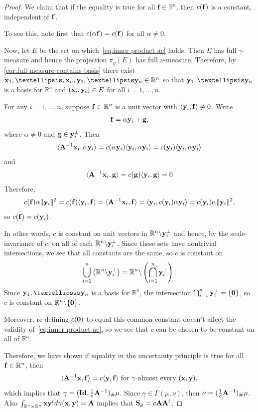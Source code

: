 \documentclass[10pt,a4paper]{amsart}
\newcommand\R{{\mathbb R}}
\begin{document}
\begin{proof}
We claim that if the equality is true for all $\mathbf{f} \in \mathbb{R}^n$, then $c({\bf f})$ is a constant, independent of ${\bf f}$. 

To see this, note first that $c(\alpha {\bf f}) = c({\bf f})$ for all $\alpha \neq 0$. 

Now, let $E$ be the set on which~\eqref{eq:inner product ae} holds. Then $E$ has full $\gamma$-measure and hence the projection $\pi_y(E)$ has full $\nu$-measure. Therefore, by \cref{cor:full measure contains basis} there exist ${\bf x}_1, \dots , {\bf x}_n, {\bf y}_1, \dots {\bf y}_n \in \R^n$ so that ${\bf y}_1, \dots {\bf y}_n$ is a basis for $\R^n$ and $({\bf x}_i, {\bf y}_i) \in E$ for all $i=1, \dots , n$.

For any $i=1, \dots , n$, suppose ${\bf f} \in \R^n$ is a unit vector with $\langle {\bf y}_i, {\bf f} \rangle \neq 0$. Write 
\[
    {\bf f} = \alpha {\bf y}_i + {\bf g},
\]
where $\alpha \neq 0$ and ${\bf g} \in {\bf y}_i^\perp$. Then
\[
\langle {\bf A}^{-1}{\bf x}_i,\alpha {\bf y}_i\rangle
= c(\alpha {\bf y}_i) \langle {\bf y}_i,\alpha {\bf y}_i\rangle = c({\bf y}_i) \langle {\bf y}_i,\alpha {\bf y}_i\rangle
\]
and
\[
    \langle {\bf A}^{-1}{\bf x}_i,{\bf g}\rangle = c({\bf g}) \langle {\bf y}_i,{\bf g}\rangle = 0
\]
Therefore,
\[
    c({\bf f}) \alpha \|{\bf y}_i\|^2 = c({\bf f})\langle {\bf y}_i, {\bf f}\rangle = \langle {\bf A}^{-1} {\bf x}_i , {\bf f} \rangle = \langle {\bf y}_i , c({\bf y}_i) \alpha {\bf y}_i\rangle = c({\bf y}_i) \alpha \|{\bf y}_i\|^2,
\]
so $c({\bf f}) = c({\bf y}_i)$. 

In other words, $c$ is constant on unit vectors in $\R^n \backslash{\bf y}_i^\perp$ and hence, by the scale-invariance of $c$, on all of each $\R^n \backslash{\bf y}_i^\perp$. Since these sets have nontrivial intersections, we see that all constants are the same, so $c$ is constant on 
$$\bigcup_{i=1}^n \left(\R^n \backslash {\bf y}_i^\perp\right) = \R^n \backslash \left(\bigcap_{i=1}^n {\bf y}_i^\perp\right).
$$
Since ${\bf y}_1, \dots {\bf y}_n$ is a basis for $\R^n$, the intersection $\bigcap_{i=1}^n {\bf y}_i^\perp = \{{\bf 0}\}$, so $c$ is constant on $\R^n \backslash \{{\bf 0}\}$.

Moreover, re-defining $c({\bf 0})$ to equal this common constant doesn't affect the validity of~\eqref{eq:inner product ae}, so we see that $c$ can be chosen to be constant on all of $\R^n$.

Therefore, we have shown if equality in the uncertainty principle is true for all ${\bf f} \in \mathbb{R}^n$,  then
$$\langle {\bf A}^{-1}{\bf x},{\bf f}\rangle
= c \langle {\bf y},{\bf f}\rangle
\ \text{for $\gamma$-almost every }({\bf x},{\bf y}),$$ which implies that $\gamma = (\mathbf{Id}, \frac{1}{c}{\bf A}^{-1})_\#\mu$. Since $\gamma \in \Gamma(\mu, \nu)$, then $\nu = (\frac{1}{c}{\bf A}^{-1})_\#\mu$. Also $\int_{\mathbb{R}^n \times \mathbb{R}^n} {\bf x} {\bf y}^t d\gamma({\bf x, y}) = {\bf A}$ implies that ${\bf S}_{\mu}=c{\bf A}{\bf A}^{t}$.


\end{proof}
\end{document}
